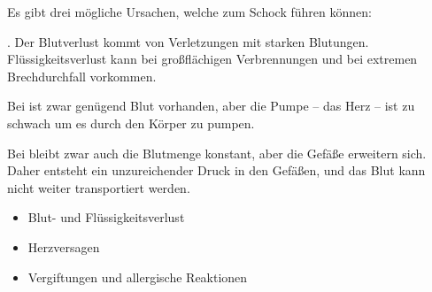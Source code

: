 {
Es gibt drei mögliche Ursachen, welche zum Schock führen
können:

. Der Blutverlust kommt von Verletzungen mit
starken Blutungen. Flüssigkeitsverlust kann bei großflächigen Verbrennungen und
bei extremen Brechdurchfall vorkommen. 

Bei  ist zwar
genügend Blut vorhanden, aber die Pumpe -- das Herz -- ist
zu schwach um es durch den Körper zu pumpen. 

Bei  bleibt
zwar auch die Blutmenge konstant, aber die Gefäße erweitern sich. Daher
entsteht ein unzureichender Druck in den Gefäßen, und das Blut kann nicht weiter
transportiert werden. 
}{
\begin{itemize}
    \item Blut- und Flüssigkeitsverlust
    \item Herzversagen
    \item Vergiftungen und allergische Reaktionen
\end{itemize}
}{}{}{}

% 
% 
% 
% 
% 
% 
% 

